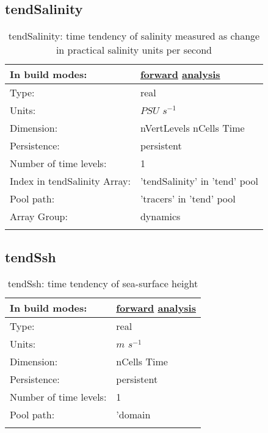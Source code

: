 \subsection[tendSalinity]{tendSalinity}
\label{subsec:var_sec_tend_tendSalinity}
\begin{center}
\begin{longtable}{| p{2.0in} | p{4.0in} |}
        \hline 
        In build modes: & \hyperref[subsec:forward_var_tab_tend]{forward} \hyperref[subsec:analysis_var_tab_tend]{analysis} \\
        \hline 
        Type: & real \\
        \hline 
        Units: & $PSU$ $s^{-1}$ \\
        \hline 
        Dimension: & nVertLevels nCells Time \\
        \hline 
        Persistence: & persistent \\
        \hline 
        Number of time levels: & 1 \\
        \hline 
		 Index in tendSalinity Array: & 'tendSalinity' in 'tend' pool \\
		 \hline 
            Pool path: & 'tracers' in 'tend' pool
 \\
		 \hline 
		 Array Group: & dynamics \\
		 \hline 
    \caption{tendSalinity: time tendency of salinity measured as change in practical salinity units per second}
\end{longtable}
\end{center}
\subsection[tendSsh]{tendSsh}
\label{subsec:var_sec_tend_tendSsh}
\begin{center}
\begin{longtable}{| p{2.0in} | p{4.0in} |}
        \hline 
        In build modes: & \hyperref[subsec:forward_var_tab_tend]{forward} \hyperref[subsec:analysis_var_tab_tend]{analysis} \\
        \hline 
        Type: & real \\
        \hline 
        Units: & $m$ $s^{-1}$ \\
        \hline 
        Dimension: & nCells Time \\
        \hline 
        Persistence: & persistent \\
        \hline 
        Number of time levels: & 1 \\
        \hline 
            Pool path: & 'domain %
 \\
		 \hline 
    \caption{tendSsh: time tendency of sea-surface height}
\end{longtable}
\end{center}
